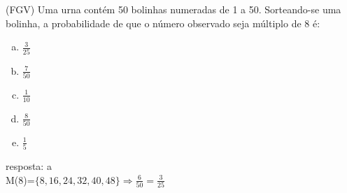 \begin{ex}
 (FGV) Uma urna contém 50 bolinhas numeradas de 1 a 50. Sorteando-se uma bolinha, a probabilidade de que o número observado seja múltiplo de 8 é:
   \begin{enumerate}[(a)]
   \item $\frac{3}{25}$
   \item $\frac{7}{50}$
   \item $\frac{1}{10}$
   \item $\frac{8}{50}$
   \item $\frac{1}{5}$
   \end{enumerate}
     \begin{sol}
      resposta: a \\
      M(8)=$\{8,16,24,32,40,48\}\Longrightarrow \frac{6}{50}=\frac{3}{25}$
     \end{sol}
\end{ex}